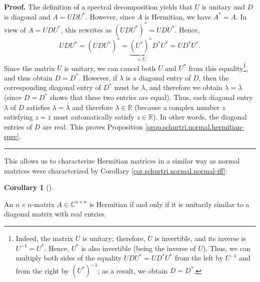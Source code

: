 \documentclass[numbers=enddot,12pt,final,onecolumn,notitlepage]{scrartcl}%
\numberwithin{exer}{subsection}
\theoremstyle{definition}
\newtheorem{coro}[theo]{Corollary}
\newenvironment{corollary}[1][]
{\begin{coro}[#1]\begin{leftbar}}
{\end{leftbar}\end{coro}}
\newenvironment{proof}[1][Proof]{\noindent\textbf{#1.} }{\ \rule{0.5em}{0.5em}}
\begin{document}
\begin{proof}
The definition of a spectral decomposition yields that $U$ is unitary and $D$
is diagonal and $A=UDU^{\ast}$. However, since $A$ is Hermitian, we have
$A^{\ast}=A$. In view of $A=UDU^{\ast}$, this rewrites as $\left(  UDU^{\ast
}\right)  ^{\ast}=UDU^{\ast}$. Hence,
\[
UDU^{\ast}=\left(  UDU^{\ast}\right)  ^{\ast}=\underbrace{\left(  U^{\ast
}\right)  ^{\ast}}_{=U}D^{\ast}U^{\ast}=UD^{\ast}U^{\ast}.
\]
Since the matrix $U$ is unitary, we can cancel both $U$ and $U^{\ast}$ from
this equality\footnote{Indeed, the matrix $U$ is unitary; therefore, $U$ is
invertible, and its inverse is $U^{-1}=U^{\ast}$. Hence, $U^{\ast}$ is also
invertible (being the inverse of $U$). Thus, we can multiply both sides of the
equality $UDU^{\ast}=UD^{\ast}U^{\ast}$ from the left by $U^{-1}$ and from the
right by $\left(  U^{\ast}\right)  ^{-1}$; as a result, we obtain $D=D^{\ast}%
$.}, and thus obtain $D=D^{\ast}$. However, if $\lambda$ is a diagonal entry
of $D$, then the corresponding diagonal entry of $D^{\ast}$ must be
$\overline{\lambda}$, and therefore we obtain $\lambda=\overline{\lambda}$
(since $D=D^{\ast}$ shows that these two entries are equal). Thus, each
diagonal entry $\lambda$ of $D$ satisfies $\lambda=\overline{\lambda}$ and
therefore $\lambda\in\mathbb{R}$ (because a complex number $z$ satisfying
$z=\overline{z}$ must automatically satisfy $z\in\mathbb{R}$). In other words,
the diagonal entries of $D$ are real. This proves Proposition
\ref{prop.schurtri.normal.hermitian-spec}.
\end{proof}

This allows us to characterize Hermitian matrices in a similar way as normal
matrices were characterized by Corollary \ref{cor.schurtri.normal.normal-iff}:

\begin{corollary}
\label{cor.schurtri.normal.hermitian-iff}An $n\times n$-matrix $A\in
\mathbb{C}^{n\times n}$ is Hermitian if and only if it is unitarily similar to
a diagonal matrix with real entries.
\end{corollary}
\end{document}
